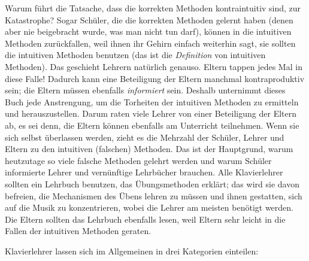 Warum führt die Tatsache, dass die korrekten Methoden kontraintuitiv sind, zur Katastrophe?
Sogar Schüler, die die korrekten Methoden gelernt haben (denen aber nie beigebracht wurde, was man nicht tun darf), können in die intuitiven Methoden zurückfallen, weil ihnen ihr Gehirn einfach weiterhin sagt, sie sollten die intuitiven Methoden benutzen (das ist die \textit{Definition} von intuitiven Methoden).
Das geschieht Lehrern natürlich genauso.
Eltern tappen jedes Mal in diese Falle!
Dadurch kann eine Beteiligung der Eltern manchmal kontraproduktiv sein; die Eltern müssen ebenfalls \textit{informiert} sein.
Deshalb unternimmt dieses Buch jede Anstrengung, um die Torheiten der intuitiven Methoden zu ermitteln und herauszustellen.
Darum raten viele Lehrer von einer Beteiligung der Eltern ab, es sei denn, die Eltern können ebenfalls am Unterricht teilnehmen.
Wenn sie sich selbst überlassen werden, zieht es die Mehrzahl der Schüler, Lehrer und Eltern zu den intuitiven (falschen) Methoden.
Das ist der Hauptgrund, warum heutzutage so viele falsche Methoden gelehrt werden und warum Schüler informierte Lehrer und vernünftige Lehrbücher brauchen.
Alle Klavierlehrer sollten ein Lehrbuch benutzen, das Übungsmethoden erklärt; das wird sie davon befreien, die Mechanismen des Übens lehren zu müssen und ihnen gestatten, sich auf die Musik zu konzentrieren, wobei die Lehrer am meisten benötigt werden.
Die Eltern sollten das Lehrbuch ebenfalls lesen, weil Eltern sehr leicht in die Fallen der intuitiven Methoden geraten.

Klavierlehrer lassen sich im Allgemeinen in drei Kategorien einteilen:

